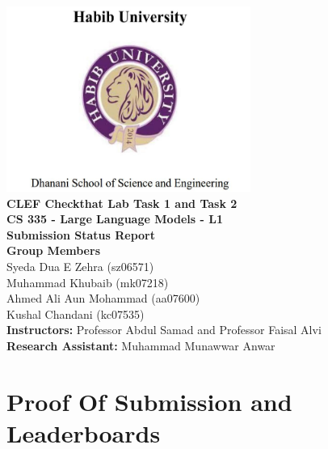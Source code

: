 \documentclass{article}
\begin{document}
\begin{center}
    {\includegraphics[width=8cm]{LOGOHABIB.png} \\
    \vspace{10mm}}
    {\LARGE \textbf{CLEF Checkthat Lab Task 1 and Task 2}} \\
    \vspace{5mm}
    {\Large \textbf{CS 335 - Large Language Models - L1}} \\
    \vspace{10mm}
    {\Huge \textbf{Submission Status Report}} \\
    \vspace{10mm}
    {\Large \textbf{Group Members}} \\
    \vspace{5mm}
    {\large Syeda Dua E Zehra (sz06571)} \\
    \vspace{2mm}
    {\large Muhammad Khubaib (mk07218)} \\
    \vspace{2mm}
    {\large Ahmed Ali Aun Mohammad (aa07600)} \\
    \vspace{2mm}
    {\large Kushal Chandani (kc07535)} \\
    \vspace{4mm}
    {\large \textbf{Instructors:} Professor Abdul Samad and Professor Faisal Alvi} \\
    \vspace{4mm}
    {\large \textbf{Research Assistant:} Muhammad Munawwar Anwar } \\
\end{center}

\newpage

\section{\textcolor{sectioncolor}{Proof Of Submission and Leaderboards}}
\end{document}
